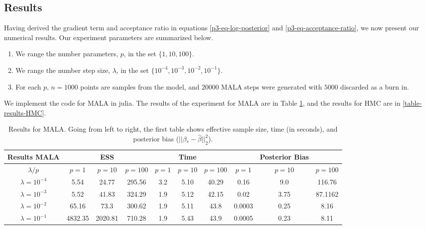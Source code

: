 \documentclass{article}
\begin{document}
\subsection{Results}
Having derived the gradient term and acceptance ratio in equations \ref{p3-eq-log-posterior} and \ref{p3-eq-acceptance-ratio}, 
we now present our numerical results.
Our experiment parameters are summarized below.
\begin{enumerate}
    \item We range the number parameters, $p$, in the set $\{1, 10, 100\}$.
    \item We range the number step size, $\lambda$, in the set $\{10^{-4}, 10^{-3}, 10^{-2}, 10^{-1}\}$.
    \item For each $p$, $n=1000$ points are samples from the model, and $20000$ MALA steps were generated with $5000$ discarded as a burn in.  
\end{enumerate}
We implement the code for MALA in julia. The results of the experiment for MALA are in Table \ref{table-results-mala}, and the results for HMC are in \ref{table-results-HMC}.
\begin{table}[ht]
    \centering
    \caption{Results for MALA. Going from left to right, the first table shows effective sample size, time (in seconds), and posterior bias ($||\beta_* - \hat{\beta}||_2^2$).}
    \label{table-results-mala}
    \footnotesize
    \begin{tabular}{| c | c c c || c c c || c c c |} \toprule
    Results MALA                    & & ESS &  &  & Time &  & & Posterior Bias &  \\ \midrule
    $\lambda / p$                    & $p=1$ & $p = 10$ & $p = 100$ & $p=1$ & $p = 10$ & $p = 100$ & $p=1$ & $p = 10$ & $p = 100$ \\ \midrule 
    $\lambda = 10^{-4}$   &  5.54     &    24.77      &     295.56      &   3.2   &   5.10    &    40.29  &     0.16     &    9.0      &  116.76 \\
    $\lambda = 10^{-3}$   &  5.52    &    41.83      &    324.29      &   1.9    &  5.12     &   42.15  &     0.02     &      3.75    & 87.1162\\
    $\lambda = 10^{-2}$   &  65.16     &  73.3       &    300.62       &   1.9    &  5.11     &   43.8   &     0.0003      &    0.25      & 8.16\\
    $\lambda = 10^{-1}$   &  4832.35    &  2020.81        &   710.28        &   1.9    &  5.43     &   43.9   &     0.0005      &    0.23      & 8.11 \\\bottomrule
    \end{tabular}
\end{table}
\end{document}

